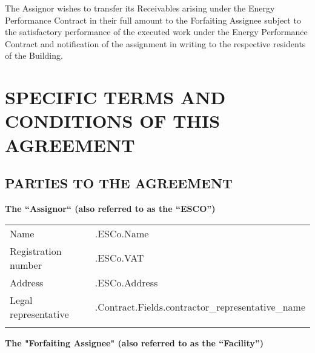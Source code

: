 \documentclass[a4paper]{article}
\begin{document}
The Assignor wishes to transfer its Receivables arising under the
Energy Performance Contract in their full amount to the Forfaiting
Assignee subject to the satisfactory performance of the executed work
under the Energy Performance Contract and notification of the
assignment in writing to the respective residents of the Building.\par

\pagebreak

\renewcommand\thesection{}
\renewcommand\thesubsection{\arabic{subsection}}
\renewcommand\thesubsubsection{\thesubsection.\arabic{subsubsection}.}

\renewcommand*{\theenumi}{\thesubsection.\arabic{enumi}}
\renewcommand*{\theenumii}{\theenumi.\arabic{enumii}}

\section{SPECIFIC TERMS AND CONDITIONS OF THIS AGREEMENT}
\vspace{5mm}

\subsection{PARTIES TO THE AGREEMENT}

\textbf{The “Assignor“ (also referred to as the “ESCO”)}

\vspace{2mm}

\begin{tabu}{|X|X[2]|} \tabucline{}
  Name                  &{{.ESCo.Name}}                                          \\\tabucline{}
  Registration number   &{{.ESCo.VAT}}                                           \\\tabucline{}
  Address               &{{.ESCo.Address}}                                       \\\tabucline{}
  Legal representative  &{{.Contract.Fields.contractor_representative_name}}     \\\tabucline{}
\end{tabu}

\vspace{5mm}

\textbf{The "Forfaiting Assignee" (also referred to as the “Facility”)}

\vspace{2mm}
\end{document}
